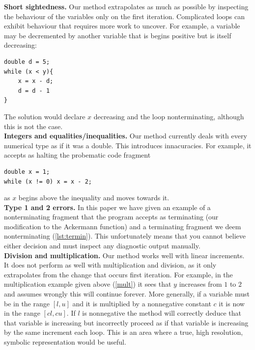 \documentclass[12pt,a4paper]{article}
\begin{document}
\textbf{Short sightedness.} Our method extrapolates as much as possible by inspecting the behaviour of the variables only on the first iteration. Complicated loops can exhibit behaviour that requires more work to uncover. For example, a variable may be decremented by another variable that is begins positive but is itself
decreasing:

\begin{center}
\begin{minipage}{5.5cm}
\begin{lstlisting}[language=myLang, frame=tlrb, numbers=none, label={lst:termin}, linewidth=5cm]
double d = 5;
while (x < y){
	x = x - d;
	d = d - 1
}
\end{lstlisting}
\end{minipage}
\end{center}

The solution would declare $x$ decreasing and the loop nonterminating, although this is not the case.\\

\textbf{Integers and equalities/inequalities.} Our method currently deals with every numerical type as if it was a double. This introduces innacuracies. For example, it accepts as halting
the probematic code fragment
\begin{center}
\begin{minipage}{6.5cm}
\begin{lstlisting}[language=myLang, frame=tlrb, numbers=none, linewidth=6cm]
double x = 1;
while (x != 0) x = x - 2;
\end{lstlisting}
\end{minipage}
\end{center}
as $x$ begins above the inequality and moves towards it.\\

\textbf{Type 1 and 2 errors.} In this paper we have given an example of a nonterminating fragment that the program accepts as terminating (our modification to the
Ackermann function) and a terminating fragment we deem nonterminating (\cref{lst:termin}). This unfortunately means that you cannot believe either decision and must
inspect any diagnostic output manually.\\

\textbf{Division and multiplication.} Our method works well with linear increments. It does not perform as well with multiplication and division, as it only extrapolates
from the change that occurs first iteration. For example, in the multiplication example given above (\cref{mult}) it sees that $y$ increases from $1$ to $2$
and assumes wrongly this will continue forever. More generally, if a variable must be in the range $[l, u]$ and it is multiplied by a nonnegative constant $c$ it is now in the range $[cl, cu]$. If $l$ is nonnegative the method will correctly deduce that that variable is increasing but incorrectly proceed as if that variable is increasing by the same increment each loop. This is an area where a true, high resolution, symbolic representation would be useful.
\end{document}

